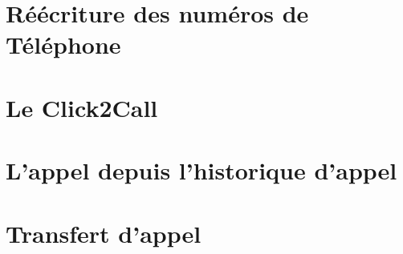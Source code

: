\section{Réécriture des numéros de Téléphone}

\section{Le Click2Call}

\section{L'appel depuis l'historique d'appel}

\section{Transfert d'appel}